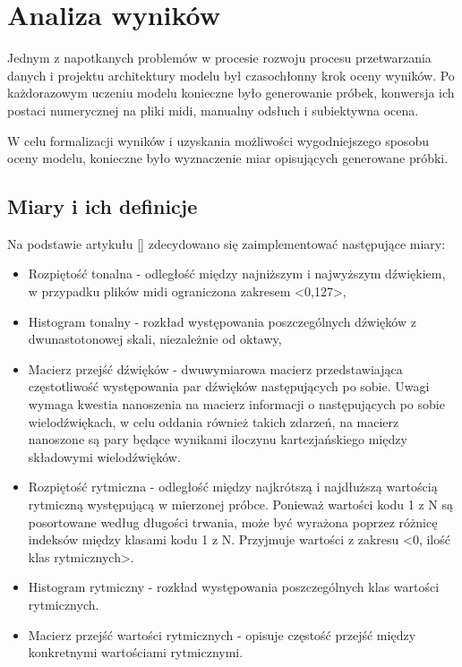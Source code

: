 \chapter{Analiza wyników}
{

    Jednym z napotkanych problemów w procesie rozwoju procesu przetwarzania danych i projektu architektury modelu
    był czasochłonny krok oceny wyników. Po każdorazowym uczeniu modelu konieczne było generowanie próbek, 
    konwersja ich postaci numerycznej na pliki midi, manualny odsłuch i subiektywna ocena.

    W celu formalizacji wyników i uzyskania możliwości wygodniejszego sposobu oceny modelu, konieczne było wyznaczenie
    miar opisujących generowane próbki. 

    \section{Miary i ich definicje}
    {
        Na podstawie artykułu [] zdecydowano się zaimplementować następujące miary:
        \begin{itemize}
            \item Rozpiętość tonalna - odległość między najniższym i najwyższym dźwiękiem, w przypadku plików midi ograniczona
            zakresem <0,127>,
            \item Histogram tonalny - rozkład występowania poszczególnych dźwięków z dwunastotonowej skali, niezależnie od oktawy, 
            \item Macierz przejść dźwięków - dwuwymiarowa macierz przedstawiająca częstotliwość występowania par dźwięków następujących
            po sobie. Uwagi wymaga kwestia nanoszenia na macierz informacji o następujących po sobie wielodźwiękach, w celu oddania
            również takich zdarzeń, na macierz nanoszone są pary będące wynikami iloczynu kartezjańskiego między składowymi wielodźwięków.
            \item Rozpiętość rytmiczna - odległość między najkrótszą i najdłuższą wartością rytmiczną występującą w mierzonej próbce. 
            Ponieważ wartości kodu 1 z N są posortowane według długości trwania, może być wyrażona poprzez różnicę indeksów 
            między klasami kodu 1 z N. Przyjmuje wartości z zakresu <0, ilość klas rytmicznych>.
            \item Histogram rytmiczny - rozkład występowania poszczególnych klas wartości rytmicznych.
            \item Macierz przejść wartości rytmicznych - opisuje częstość przejść między konkretnymi wartościami rytmicznymi.
        \end{itemize}

}}
